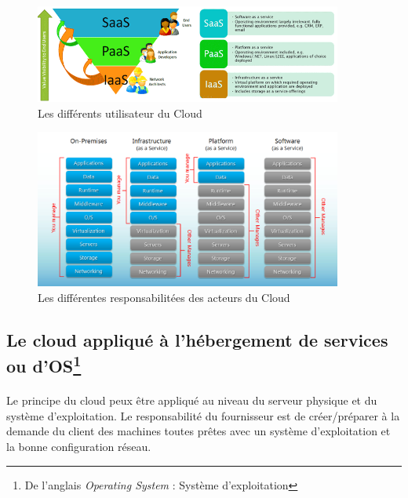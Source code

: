 \subsection*{} %

\begin{figure}[H]
\centering
\includegraphics[width=0.9\textwidth]{resource/img/clouds-users}
\caption{Les différents utilisateur du Cloud}
\end{figure}

\begin{figure}[H]
\centering
\includegraphics[width=0.9\textwidth]{resource/img/clouds-responsabilities}
\caption{Les différentes responsabilitées des acteurs du Cloud}
\end{figure}

\subsection{Le cloud appliqué à l'hébergement de services ou d'OS\protect\footnote{De l'anglais \emph{Operating System} : Système d'exploitation}}
\paragraph*{}
Le principe du cloud peux être appliqué au niveau du serveur physique et du système d'exploitation. Le responsabilité du fournisseur est de créer/préparer
à la demande du client des machines toutes prêtes avec un système d'exploitation et la bonne configuration réseau.

